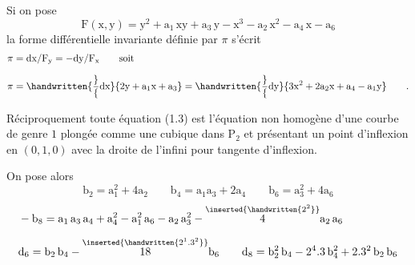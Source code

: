 Si on pose
\[
\mathrm{F}(\mathrm{x},\mathrm{y})=\mathrm{y}^{2}+\mathrm{a}_{1}\,\mathrm{xy}+\mathrm{a}_{3}\,\mathrm{y}-\mathrm{x}^{3}-\mathrm{a}_{2}\,\mathrm{x}^{2}-\mathrm{a}_{4}\,\mathrm{x}-\mathrm{a}_{6}
\]
la forme différentielle invariante définie par $\pi$ s'écrit
\[
\begin{aligned}
\pi&=\mathrm{dx}/\mathrm{F}_{\mathrm{y}}=-\mathrm{dy}/\mathrm{F}_{\mathrm{x}}\qquad\text{soit}\\[.65em]
\pi&=\handwritten{\frac}{\mathrm{dx}}{2\mathrm{y}+\mathrm{a}_{1}\mathrm{x}+\mathrm{a}_{3}}
=\handwritten{\frac}{\mathrm{dy}}{3\mathrm{x}^{2}+2\mathrm{a}_{2}\mathrm{x}+\mathrm{a}_{4}-\mathrm{a}_{1}\mathrm{y}}\qquad.
\end{aligned}
\]

Réciproquement toute équation (1.3) est l'équation non homogène d'une courbe de genre $1$ plongée comme une cubique dans $\mathrm{P}_{2}$ et présentant un point d'inflexion en $(0,1,0)$ avec la droite de l'infini pour tangente d'inflexion.

On pose alors
\reversemarginpar
\[
\mathrm{b}_{2}=\mathrm{a}_{1}^{2}+4\mathrm{a}_{2}\qquad
\mathrm{b}_{4}=\mathrm{a}_{1}\mathrm{a}_{3}+2\mathrm{a}_{4}\qquad
\mathrm{b}_{6}=\mathrm{a}_{3}^{2}+4\mathrm{a}_{6}
\tag*{(1.4)}
\]
\[
\begin{aligned}
&-\mathrm{b}_{8}=\mathrm{a}_{1}\,\mathrm{a}_{3}\,\mathrm{a}_{4}+\mathrm{a}_{4}^{2}-\mathrm{a}_{1}^{2}\,\mathrm{a}_{6}-\mathrm{a}_{2}\,\mathrm{a}_{3}^{2}-\overset{\inserted{\handwritten{2^{2}}}}{4}\mathrm{a}_{2}\,\mathrm{a}_{6}\\[.55em]
&\mathrm{d}_{6}=\mathrm{b}_{2}\,\mathrm{b}_{4}-\overset{\inserted{\handwritten{2^{1}.3^{2}}}}{18}\mathrm{b}_{6}\qquad
\mathrm{d}_{8}=\mathrm{b}_{2}^{2}\,\mathrm{b}_{4}-2^{4}.3\,\mathrm{b}_{4}^{2}+2.3^{2}\,\mathrm{b}_{2}\,\mathrm{b}_{6}
\end{aligned}
\]
\margin{\handwritten{$\backslash$}}\normalmarginpar

